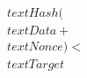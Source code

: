 \documentclass[preview]{standalone}
\begin{document}
\begin{align*}
\quad\\text{Hash}( \quad\\text{Data} + \quad\\text{Nonce} ) < \quad\\text{Target}
\end{align*}
\end{document}
